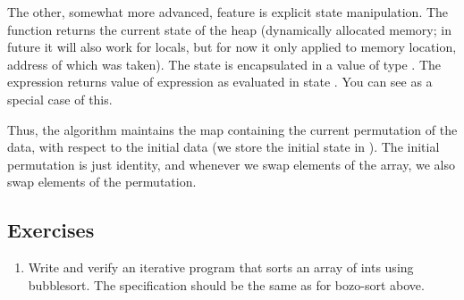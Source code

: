 The other, somewhat more advanced, feature is explicit state manipulation.
The function \vcc{\now()} returns the current state of the heap (\ie dynamically
allocated memory; in future it will also work for locals, but for now it only applied
to memory location, address of which was taken). 
The state is encapsulated in a value of type \vcc{\state}.
The expression  returns value of expression
 as evaluated in state . 
You can see   as a special case of this.

Thus, the algorithm maintains the map containing the current permutation of
the data, with respect to the initial data (we store the initial state in
).
The initial permutation is just identity, and whenever we swap elements of
the array, we also swap elements of the permutation.

\subsection*{Exercises}
\begin{enumerate}
\item
Write and verify an iterative program that sorts an array of ints using
bubblesort. The specification should be the same as for bozo-sort above.
\end{enumerate}

